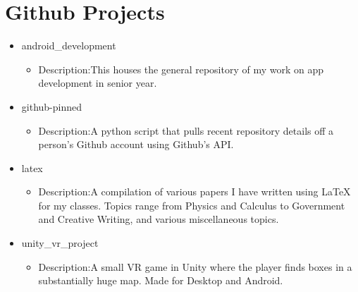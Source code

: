 \documentclass{article}%
\begin{document}
%
\normalsize%
\section{Github Projects}%
\label{sec:Github Projects}%
\begin{itemize}%
\item%
android\_development%
\begin{itemize}%
\item%
Description:This houses the general repository of my work on app development in senior year.%
\end{itemize}%
\end{itemize}%
\begin{itemize}%
\item%
github{-}pinned%
\begin{itemize}%
\item%
Description:A python script that pulls recent repository details off a person's Github account using Github's API. %
\end{itemize}%
\end{itemize}%
\begin{itemize}%
\item%
latex%
\begin{itemize}%
\item%
Description:A compilation of various papers I have written using LaTeX for my classes. Topics range from Physics and Calculus to Government and Creative Writing, and various miscellaneous topics. %
\end{itemize}%
\end{itemize}%
\begin{itemize}%
\item%
unity\_vr\_project%
\begin{itemize}%
\item%
Description:A small VR game in Unity where the player finds boxes in a substantially huge map. Made for Desktop and Android.%
\end{itemize}%
\end{itemize}

%
\end{document}
